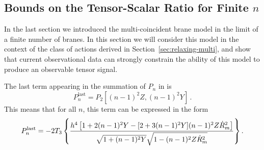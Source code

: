 % 
% 
\subsection{Bounds on the Tensor-Scalar Ratio for Finite \texorpdfstring{$n$}{n}} 
\label{sec:multibounds-multi}
In the last section we introduced the multi-coincident brane model in the limit
of a finite number of branes. In this section we will consider this model in
the context of the class of actions derived in Section~\ref{sec:relaxing-multi},
and show that current observational data can strongly constrain the ability of
this model to produce an observable tensor signal.

The last term appearing in the summation of $P_n$ in 
is 
\begin{equation}
P_n^{\mathrm{last}} = P_2\left[(n-1)^2Z, (n-1)^2Y\right]\,.
\end{equation} 
This 
means that for all $n$, this term can be expressed in the form 
% 
\begin{equation}
\label{eq:unifiedgenP-multi}
P_n^\mathrm{last} = -2T_3 \left\{ \frac{h^4 \left[ 1+2(n-1)^2Y
- [ 2+3(n-1)^2Y] (n-1)^2Z\dot{R}_m^2  \right]}{\sqrt{1+(n-1)^2Y}
\sqrt{1-(n-1)^2Z\dot{R}_m^2}} 
 \right\}.
\end{equation}
% 


